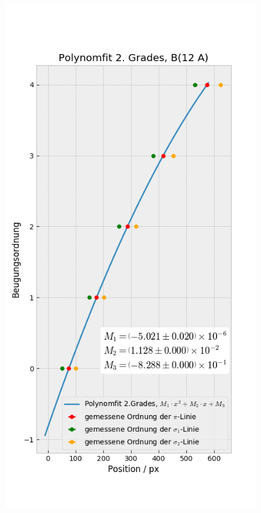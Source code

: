 \begin{landscape}
\begin{figure}
            \includegraphics[width=.45\paperwidth]{Auswertung/scatterorder/sco_12A}

\end{figure}
\end{landscape}
